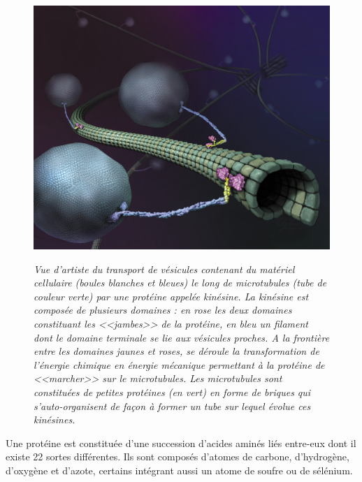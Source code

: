 \begin{figure}[h]
  \centering
  {\includegraphics[width=0.85\linewidth]{./figures/ch1/kinesincargoart}}
    \caption{\it Vue d’artiste du transport de vésicules contenant du matériel cellulaire (boules blanches et bleues) le long de microtubules (tube de couleur verte) par une protéine appelée kinésine. La kinésine est composée de plusieurs domaines : en rose les deux domaines constituant les <<jambes>> de la protéine, en bleu un filament dont le domaine terminale se lie aux vésicules proches. A la frontière entre les domaines jaunes et roses, se déroule la transformation de l'énergie chimique en énergie mécanique permettant à la protéine de <<marcher>> sur le microtubules. Les microtubules sont constituées de petites protéines (en vert) en forme de briques qui s'auto-organisent de façon à former un tube sur lequel évolue ces kinésines.}
    \label{Fig:kinesincargoart}
  \hspace{0.2cm}
\end{figure}


Une protéine est constituée d'une succession d'acides aminés liés entre-eux dont il existe 22 sortes différentes. Ils sont composés d'atomes de carbone, d'hydrogène, d'oxygène et d'azote, certains intégrant aussi un atome de soufre ou de sélénium.


